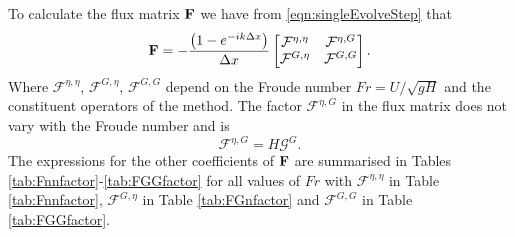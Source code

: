 To calculate the flux matrix $\mathbf{F}$ we have from \eqref{eqn:singleEvolveStep} that
\begin{equation*}
 \mathbf{F} = - \dfrac{\left(1 - e^{-ik\Delta x}\right)}{ \Delta x}\begin{bmatrix}
 \mathcal{F}^{\eta,\eta} & \mathcal{F}^{\eta,G} \\\mathcal{F}^{G,\eta} &\mathcal{F}^{G,G}
 \end{bmatrix}.
\end{equation*}
Where $\mathcal{F}^{\eta,\eta} $, $\mathcal{F}^{G,\eta} $, $\mathcal{F}^{G,G} $ depend on the Froude number $Fr = {U}/{\sqrt{gH}}$ and the constituent operators of the method. The factor $\mathcal{F}^{\eta,G}$ in the flux matrix does not vary with the Froude number and is
\[\mathcal{F}^{\eta,G} = H \mathcal{G}^G. \]
The expressions for the other coefficients of $\mathbf{F}$ are summarised in Tables \ref{tab:Fnnfactor}-\ref{tab:FGGfactor} for all values of $Fr$ with $\mathcal{F}^{\eta,\eta}$ in Table \ref{tab:Fnnfactor}, $\mathcal{F}^{G,\eta}$ in Table \ref{tab:FGnfactor} and $\mathcal{F}^{G,G}$ in Table \ref{tab:FGGfactor}.



